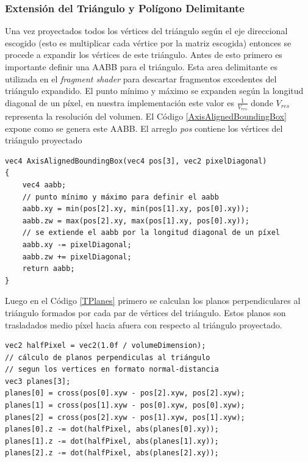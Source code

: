 \subsubsection{Extensión del Triángulo y Polígono Delimitante}
Una vez proyectados todos los vértices del triángulo según el eje direccional escogido (esto es multiplicar cada vértice por la matriz escogida) entonces se procede a expandir los vértices de este triángulo. Antes de esto primero es importante definir una \ac{AABB} para el triángulo. Esta area delimitante es utilizada en el \emph{fragment shader} para descartar fragmentos excedentes del triángulo expandido. El punto mínimo y máximo se expanden según la longitud diagonal de un píxel, en nuestra implementación este valor es $\frac{1}{V_{res}}$ donde $V_{res}$ representa la resolución del volumen. El Código \ref{AxisAlignedBoundingBox} expone como se genera este \ac{AABB}.  El arreglo \emph{pos} contiene los vértices del triángulo proyectado
\\
\begin{lstlisting}[caption={Creación de un \ac{AABB} para el triángulo proyectado.}, label=AxisAlignedBoundingBox]
vec4 AxisAlignedBoundingBox(vec4 pos[3], vec2 pixelDiagonal)
{
    vec4 aabb;
    // punto mínimo y máximo para definir el aabb
    aabb.xy = min(pos[2].xy, min(pos[1].xy, pos[0].xy));
    aabb.zw = max(pos[2].xy, max(pos[1].xy, pos[0].xy));
    // se extiende el aabb por la longitud diagonal de un píxel
    aabb.xy -= pixelDiagonal;
    aabb.zw += pixelDiagonal;
    return aabb;
}
\end{lstlisting}

Luego en el Código \ref{TPlanes} primero se calculan los planos perpendiculares al triángulo formados por cada par de vértices del triángulo. Estos planos son trasladados medio píxel hacia afuera con respecto al triángulo proyectado.
\\
\begin{lstlisting}[caption={Planos por cada par de vértices del triángulo proyectado.}, label=TPlanes]
vec2 halfPixel = vec2(1.0f / volumeDimension);
// cálculo de planos perpendiculas al triángulo
// segun los vertices en formato normal-distancia
vec3 planes[3];
planes[0] = cross(pos[0].xyw - pos[2].xyw, pos[2].xyw);
planes[1] = cross(pos[1].xyw - pos[0].xyw, pos[0].xyw);
planes[2] = cross(pos[2].xyw - pos[1].xyw, pos[1].xyw);
planes[0].z -= dot(halfPixel, abs(planes[0].xy));
planes[1].z -= dot(halfPixel, abs(planes[1].xy));
planes[2].z -= dot(halfPixel, abs(planes[2].xy));
\end{lstlisting}

